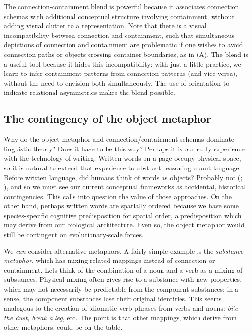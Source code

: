   The connection-containment blend is powerful because it associates connection schemas with additional conceptual structure involving containment, without adding visual clutter to a representation. Note that there is a visual incompatibility between connection and containment, such that simultaneous depictions of connection and containment are problematic if one wishes to avoid connection paths or objects crossing container boundaries, as in (A). The blend is a useful tool because it hides this incompatibility: with just a little practice, we learn to infer containment patterns from connection patterns (and vice versa), without the need to envision both simultaneously. The use of orientation to indicate relational asymmetries makes the blend possible.

\subsection{{\textbf{The contingency of the object metaphor}}}

Why do the object metaphor and connection/containment schemas dominate linguistic theory? Does it have to be this way? Perhaps it is our early experience with the technology of writing. Written words on a page occupy physical space, so it is natural to extend that experience to abstract reasoning about language. Before written language, did humans think of words as objects? Probably not (\citealt{Linell19882005}; \citealt{Ong2013}), and so we must see our current conceptual frameworks as accidental, historical contingencies. This calls into question the value of those approaches. On the other hand, perhaps written words are spatially ordered because we have some species-specific cognitive predisposition for spatial order, a predisposition which may derive from our biological architecture. Even so, the object metaphor would still be contingent on evolutionary-scale forces. 

  We \textit{can} consider alternative metaphors. A fairly simple example is the \textit{substance metaphor}, which has mixing-related mappings instead of connection or containment. Lets think of the combination of a noun and a verb as a mixing of substances. Physical mixing often gives rise to a substance with new properties, which may not necessarily be predictable from the component substances; in a sense, the component substances lose their original identities. This seems analogous to the creation of idiomatic verb phrases from verbs and nouns: \textit{bite the dust}, \textit{break a leg}, etc. The point is that other mappings, which derive from other metaphors, could be on the table.

